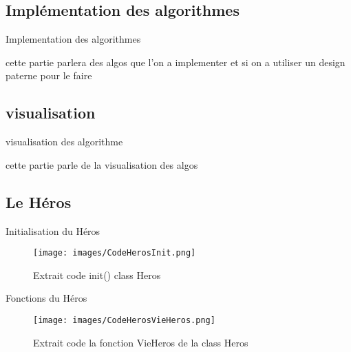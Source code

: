 \documentclass{beamer}
\begin{document}
\subsection{Implémentation des algorithmes }

\begin{frame}

	\begin{block}{Implementation des algorithmes }

	cette partie parlera des algos que l'on a implementer et si on a utiliser un design paterne pour le faire 

	\end{block}

\end{frame}




\subsection{visualisation }

\begin{frame}
	\begin{block}{visualisation des algorithme}

	cette partie parle de la visualisation des algos 
	

	\end{block}
\end{frame}




\subsection{Le Héros}

\begin{frame}

	\begin{block}{Initialisation du Héros}

	\begin{figure}[h]
	\texttt{[image: images/CodeHerosInit.png]}
	\caption{Extrait code init() class Heros}
	\end{figure}

	\end{block}


\end{frame}
\begin{frame}

	\begin{block}{Fonctions du Héros}

	\begin{figure}[h]
	\texttt{[image: images/CodeHerosVieHeros.png]}
	\caption{Extrait code la fonction VieHeros de la class Heros}
	\end{figure}

	\end{block}


\end{frame}
\end{document}
